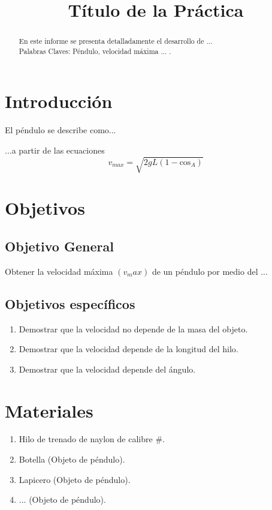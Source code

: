 \documentclass[journal]{IEEEtran}
\title{Título de la Práctica}
\author{
\authorblockA{Nombre 1 \\Nombre 2 \\...\\ Docente: ... \\ 
\today  }}
\begin{document}
\maketitle

\begin{abstract}
En este informe se presenta detalladamente el desarrollo de ...\\

Palabras Claves: Péndulo, velocidad máxima ... .
\end{abstract}


\section{Introducción}
 El péndulo se describe como...

 ...a partir de las ecuaciones 
$$v_{max}=\sqrt{2gL(1-\text{cos}_A)}$$
 


\section{Objetivos}

\subsection{Objetivo General}
Obtener la velocidad máxima $(v_max)$ de un péndulo por medio del ...

\subsection{Objetivos específicos}

\begin{enumerate}
    \item Demostrar que la velocidad no depende de la masa del objeto. 
    \item Demostrar que la velocidad depende de la longitud del hilo.
    \item Demostrar que la velocidad depende del ángulo.
\end{enumerate}


\section{Materiales}

\begin{enumerate}
    \item Hilo de trenado de naylon de calibre \#.
    \item Botella (Objeto de péndulo).
    \item Lapicero (Objeto de péndulo).
    \item ... (Objeto de péndulo).
\end{enumerate}
\end{document}
